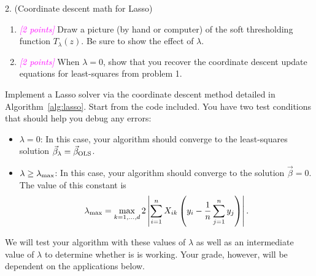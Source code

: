 \documentclass{article}
\newcommand{\points}[1]{\small\textcolor{magenta}{\emph{[#1 points]}} \normalsize}
\begin{document}
2. (Coordinate descent math for Lasso)
\begin{enumerate}
\item \points{2} Draw a picture (by hand or computer) of the soft thresholding function
  $T_\lambda (z)$. 
  Be sure to show the effect of $\lambda$.
\item \points{2} When $\lambda = 0$, show that you recover
  the coordinate descent update equations for least-squares from problem 1.
\end{enumerate}

Implement a Lasso solver via the coordinate descent method
detailed in Algorithm~\ref{alg:lasso}.
Start from the code included.
You have two test conditions that should help you debug any errors:
\begin{itemize}
\item $\lambda = 0$: In this case, your algorithm should converge to the 
  least-squares solution $\vec \beta_{\lambda} = \vec \beta_{\rm OLS}$.
\item $\lambda \geq \lambda_{\rm max}$: In this case, your algorithm should converge
  to the solution $\vec \beta = 0$.
  The value of this constant is
  \begin{equation*}
    \lambda_{\rm max} = \max_{k=1,\ldots,d} 2 \left| 
      \sum_{i=1}^n X_{ik} \left( y_i - \frac{1}{n} \sum_{j=1}^n y_j \right) \right|.
  \end{equation*}
\end{itemize}
We will test your algorithm with these values of $\lambda$ as well as an intermediate
value of $\lambda$ to determine whether is is working.
Your grade, however, will be dependent on the applications below.
\end{document}
